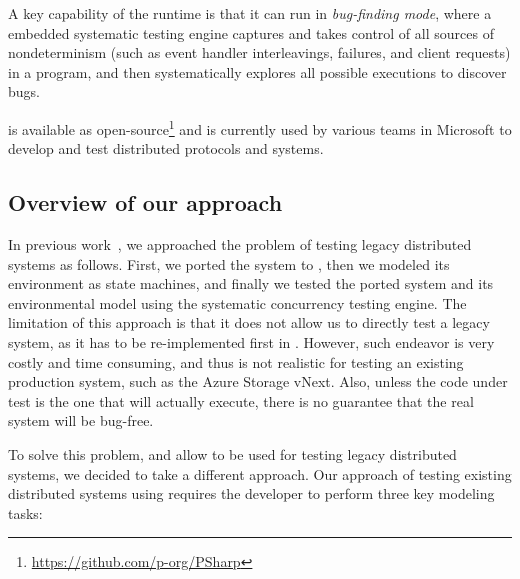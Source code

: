 A key capability of the \psharp runtime is that it can run in \emph{bug-finding mode}, where a embedded systematic testing engine captures and takes control of all sources of nondeterminism (such as event handler interleavings, failures, and client requests) in a \psharp program, and then systematically explores all possible executions to discover bugs.

\psharp is available as open-source\footnote{\url{https://github.com/p-org/PSharp}} and is currently used by various teams in Microsoft to develop and test distributed protocols and systems.


\subsection{Overview of our approach}
\label{sec:method:model}

In previous work~\cite{deligiannis2015psharp}, we approached the problem of testing legacy distributed systems as follows. First, we ported the system to \psharp, then we modeled its environment as \psharp state machines, and finally we tested the ported system and its environmental model using the \psharp systematic concurrency testing engine. The limitation of this approach is that it does not allow us to directly test a legacy system, as it has to be re-implemented first in \psharp. However, such endeavor is very costly and time consuming, and thus is not realistic for testing an existing production system, such as the Azure Storage vNext. Also, unless the code under test is the one that will actually execute, there is no guarantee that the real system will be bug-free.

To solve this problem, and allow \psharp to be used for testing legacy distributed systems, we decided to take a different approach. Our approach of testing existing distributed systems using \psharp requires the developer to perform three key modeling tasks:

